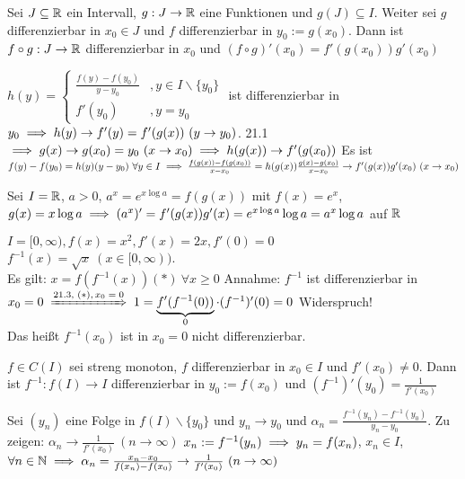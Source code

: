 \documentclass[a4paper,twoside,DIV15,BCOR12mm]{scrbook}
\begin{document}
\begin{satz}[Kettenregel]
Sei $J\subseteq\mathbb{R}$ ein Intervall, $g:J\to \mathbb{R}$ eine Funktionen und $g(J)\subseteq I$. Weiter sei $g$ differenzierbar in $x_0 \in J$ und $f$ differenzierbar in $y_0 := g(x_0)$.
Dann ist $f\circ g: J\to \mathbb{R}$ differenzierbar in $x_0$ und $(f\circ g)' (x_0) = f'(g(x_0))g'(x_0)$
\end{satz}

\begin{beweis}
$h(y) = \begin{cases}\frac{f(y)-f(y_0)}{y-y_0} &, y \in I\backslash\{y_0\} \\ f'(y_0) &, y=y_0\end{cases}$ ist differenzierbar in $y_0 \implies h(y) \to f'(y) = f'(g(x)) \ (y\to y_0)$. 21.1 $\implies g(x) \to g(x_0) = y_0 \ (x\to x_0) \implies h(g(x)) \to f'(g(x_0))$ Es ist $f(y) - f(y_0) = h(y)(y-y_0) \ \forall y\in I \implies \frac{f(g(x)) - f(g(x_0))}{x-x_0} = h(g(x))\frac{g(x)-g(x_0)}{x-x_0} \to f'(g(x))g'(x_0)\ (x\to x_0)$
\end{beweis}

\begin{beispiele}
\item Sei $I=\mathbb{R}$, $a>0$, $a^x = e^{x\log a} = f(g(x))$ mit $f(x)= e^x$, $g(x)= x\log a \implies (a^x)' = f'(g(x))g'(x) = e^{x\log a} \log a = a^x \log a $ auf $\mathbb{R}$
\item $I= [0,\infty), f(x)=x^2, f'(x)=2x, f'(0)=0$\\
 $f^{-1}(x) = \sqrt{x} \ (x\in [0,\infty))$. \\
 Es gilt: $x= f(f^{-1}(x)) (*) \ \forall x\ge 0$ Annahme: $f^{-1}$ ist differenzierbar in $x_0 = 0 \folgtnach{21.3, \ensuremath{(*), x_0 =0}} 1 = \underbrace{f'(f^{-1}(0))}_{0}\cdot(f^{-1})'(0) = 0$ Widerspruch!\\ Das heißt $f^{-1}(x_0)$ ist in $x_0 = 0$ nicht differenzierbar.
\end{beispiele}

\begin{satz}
$f\in C(I)$ sei streng monoton, $f$ differenzierbar in $x_0\in I$ und $f'(x_0)\ne 0$. Dann ist $f^{-1}: f(I) \to I$ differenzierbar in $y_0 := f(x_0)$ und $(f^{-1})'(y_0) = \frac{1}{f'(x_0)}$
\end{satz}

\begin{beweis}
Sei $(y_n)$ eine Folge in $f(I)\backslash\{y_0\}$ und $y_n \to y_0$ und $\alpha_n= \frac{f^{-1}(y_n) - f^{-1}(y_0)}{y_n-y_0}$. Zu zeigen: $\alpha_n \to \frac{1}{f'(x_0)} \ (n\to\infty)$
$x_n := f^{-1}(y_n) \implies y_n = f(x_n)$, $x_n \in I$, $\forall n\in\MdN \folgt \alpha_n = \frac{x_n-x_0}{f(x_n)-f(x_0)} \to \frac{1}{f'(x_0)} \ (n\to\infty)$
\end{beweis}
\end{document}
